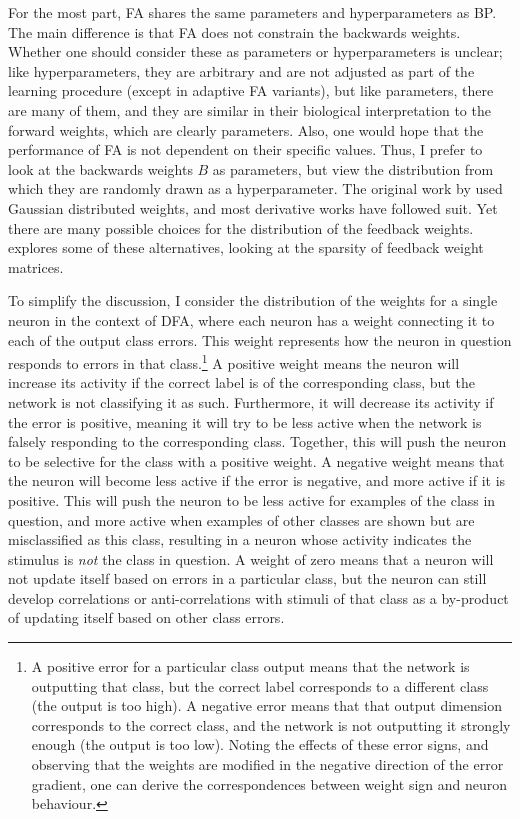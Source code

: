 For the most part, FA shares the same parameters and hyperparameters as BP.
The main difference is that FA does not constrain the backwards weights.
Whether one should consider these as parameters or hyperparameters is unclear;
like hyperparameters, they are arbitrary and are not adjusted
as part of the learning procedure (except in adaptive FA variants),
but like parameters, there are many of them,
and they are similar in their biological interpretation to the forward weights,
which are clearly parameters.
Also, one would hope that the performance of FA is not dependent
on their specific values.
Thus, I prefer to look at the backwards weights $B$ as parameters,
but view the distribution from which they are randomly drawn as a hyperparameter.
The original work by \textcite{Lillicrap2014} used Gaussian distributed weights,
and most derivative works have followed suit.
Yet there are many possible choices for the distribution of the feedback weights.
\textcite{Baldi2016} explores some of these alternatives,
looking at the sparsity of feedback weight matrices.

To simplify the discussion, I consider the distribution of the weights
for a single neuron in the context of DFA,
where each neuron has a weight connecting it to each of the output class errors.
This weight represents how the neuron in question responds
to errors in that class.\footnote{
  A positive error for a particular class output
  means that the network is outputting that class,
  but the correct label corresponds to a different class (the output is too high).
  A negative error means that that output dimension corresponds to the correct class,
  and the network is not outputting it strongly enough (the output is too low).
  Noting the effects of these error signs,
  and observing that the weights are modified in the negative direction
  of the error gradient,
  one can derive the correspondences between weight sign
  and neuron behaviour.}
A positive weight means the neuron will increase
its activity if the correct label is of the corresponding class,
but the network is not classifying it as such.
Furthermore, it will decrease its activity if the error is positive,
meaning it will try to be less active when the network
is falsely responding to the corresponding class.
Together, this will push the neuron to be selective
for the class with a positive weight.
A negative weight means that the neuron will become less active
if the error is negative, and more active if it is positive.
This will push the neuron to be less active for examples of the class in question,
and more active when examples of other classes are shown
but are misclassified as this class,
resulting in a neuron whose activity indicates the stimulus is \emph{not}
the class in question.
A weight of zero means that a neuron will not update itself
based on errors in a particular class,
but the neuron can still develop correlations or anti-correlations
with stimuli of that class
as a by-product of updating itself based on other class errors.

